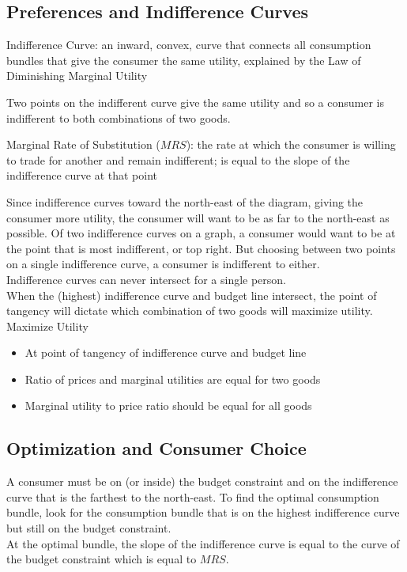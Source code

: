 \documentclass[12pt]{article}
\begin{document}
\subsection{Preferences and Indifference Curves}
\begin{definition} Indifference Curve: an inward, convex, curve that connects all consumption bundles that give the consumer the same utility, explained by the Law of Diminishing Marginal Utility \end{definition}
Two points on the indifferent curve give the same utility and so a consumer is indifferent to both combinations of two goods. 
\begin{definition} Marginal Rate of Substitution ($MRS$): the rate at which the consumer is willing to trade for another and remain indifferent; is equal to the slope of the indifference curve at that point \end{definition} 
Since indifference curves toward the north-east of the diagram, giving the consumer more utility, the consumer will want to be as far to the north-east as possible. Of two indifference curves on a graph, a consumer would want to be at the point that is most indifferent, or top right. But choosing between two points on a single indifference curve, a consumer is indifferent to either. \\
Indifference curves can never intersect for a single person. \\ 
When the (highest) indifference curve and budget line intersect, the point of tangency will dictate which combination of two goods will maximize utility. \\

Maximize Utility \begin{itemize} 
\item At point of tangency of indifference curve and budget line 
\item Ratio of prices and marginal utilities are equal for two goods
\item Marginal utility to price ratio should be equal for all goods

\end{itemize} 

\subsection{Optimization and Consumer Choice}
A consumer must be on (or inside) the budget constraint and on the indifference curve that is the farthest to the north-east. To find the optimal consumption bundle, look for the consumption bundle that is on the highest indifference curve but still on the budget constraint. \\
At the optimal bundle, the slope of the indifference curve is equal to the curve of the budget constraint which is equal to $MRS$. 
\end{document}
